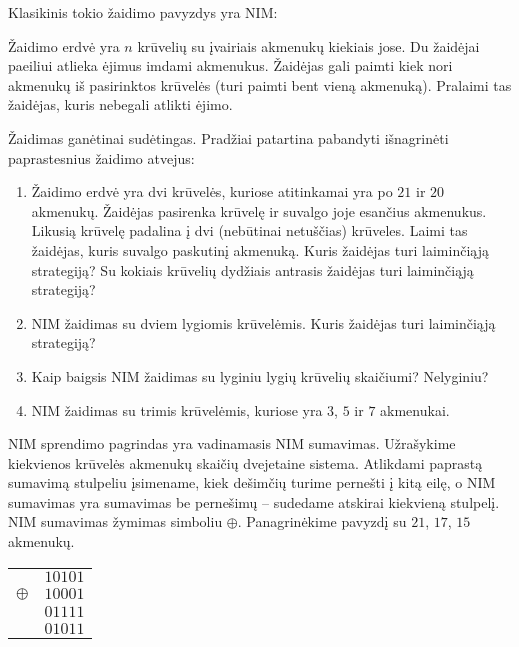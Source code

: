 Klasikinis tokio žaidimo pavyzdys yra NIM:

\begin{api}
  Žaidimo erdvė yra $n$ krūvelių su įvairiais akmenukų kiekiais jose. Du
  žaidėjai paeiliui atlieka ėjimus imdami akmenukus. Žaidėjas gali paimti
  kiek nori akmenukų iš pasirinktos krūvelės (turi paimti bent vieną
  akmenuką). Pralaimi tas žaidėjas, kuris nebegali atlikti ėjimo.
\end{api}

Žaidimas ganėtinai sudėtingas. Pradžiai patartina pabandyti išnagrinėti
paprastesnius žaidimo atvejus:

\begin{enumerate}
  \item Žaidimo erdvė yra dvi krūvelės, kuriose atitinkamai yra po $21$ ir
    $20$ akmenukų. Žaidėjas pasirenka krūvelę ir suvalgo joje esančius akmenukus.
    Likusią krūvelę padalina į dvi (nebūtinai netuščias)
    krūveles. Laimi tas žaidėjas, kuris suvalgo paskutinį akmenuką. Kuris
    žaidėjas turi laiminčiąją strategiją? Su kokiais krūvelių dydžiais
    antrasis žaidėjas turi laiminčiąją strategiją? 
  \item NIM žaidimas su dviem lygiomis krūvelėmis. Kuris žaidėjas turi
    laiminčiąją strategiją?
  \item Kaip baigsis NIM žaidimas su lyginiu lygių krūvelių skaičiumi?
    Nelyginiu? 
  \item NIM žaidimas su trimis krūvelėmis, kuriose yra $3$, $5$ ir $7$
    akmenukai.
\end{enumerate} 

NIM sprendimo pagrindas yra vadinamasis NIM sumavimas. Užrašykime
kiekvienos krūvelės akmenukų skaičių dvejetaine sistema. Atlikdami paprastą
sumavimą stulpeliu įsimename, kiek dešimčių turime pernešti į kitą
eilę, o NIM sumavimas yra sumavimas be pernešimų – sudedame atskirai
kiekvieną stulpelį. NIM sumavimas žymimas simboliu $\oplus$.
Panagrinėkime pavyzdį su  $21$, $17$, $15$ akmenukų. 

\begin{center}
  \begin{tabular}[c]{r c}
    & $10101$ \\
    $\oplus$ & $10001$ \\
    & $01111$ \\ \hline
    & $01011$
  \end{tabular}
\end{center}

